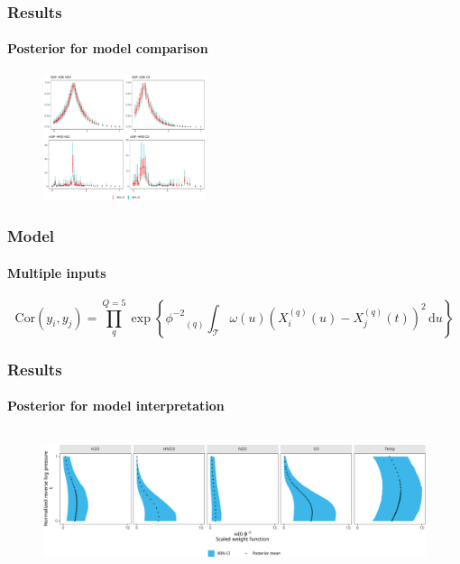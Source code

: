 \documentclass{snedecorbeamer}
\begin{document}
\begin{frame}
  \frametitle{Results}
  \framesubtitle{Posterior for model comparison}

  \begin{figure}
    \centering
    \includegraphics[height=10em]{inc/mls_weight_posterior_vifi.pdf}
  \end{figure}

\end{frame}

\begin{frame}
  \frametitle{Model}
  \framesubtitle{Multiple inputs}

  \begin{equation}
    \mathrm{Cor}(y_i, y_j) = \prod_q^{Q = 5}
    \exp\left\{
      {\phi^{-2}}_{(q)}\int_\mathcal{T}
      \omega(u){(X^{(q)}_{i}(u) - X^{(q)}_{j}(t))}^2\,\mathrm{d}u
    \right\}
  \end{equation}
\end{frame}

\begin{frame}
  \frametitle{Results}
  \framesubtitle{Posterior for model interpretation}

  \begin{figure}
    \centering
    \includegraphics[height=11em]{inc/mls_weight_posterior.pdf}
  \end{figure}

\end{frame}
\end{document}
